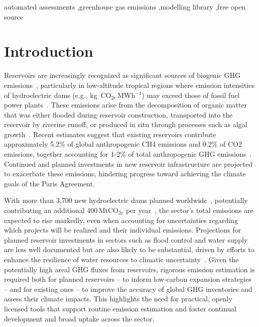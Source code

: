 \documentclass[review, authoryear, 1p]{elsarticle} %
\begin{document}
\begin{frontmatter}
\begin{keyword}
automated assessments \sep greenhouse gas emissions \sep modelling library \sep free open source
\end{keyword}

\end{frontmatter}

\section{Introduction}
\label{sec:introduction}

Reservoirs are increasingly recognized as significant sources of biogenic \ac{GHG} emissions~\citep{Barros2011}, particularly in low-altitude tropical regions where emission intensities of hydroelectric dams (e.g., kg~CO$_{2e}$\,MWh$^{-1}$) may exceed those of fossil fuel power plants~\citep{Fearnside2002}. 
These emissions arise from the decomposition of organic matter that was either flooded during reservoir construction, transported into the reservoir by riverine runoff, or produced in situ through processes such as algal growth~\citep{Louis2000}.
Recent estimates suggest that existing reservoirs contribute approximately 5.2\% of global anthropogenic \ac{CH4} emissions and 0.2\% of \ac{CO2} emissions, together accounting for 1-2\% of total anthropogenic \ac{GHG} emissions~\citep{Soued2022}.
Continued and planned investments in new reservoir infrastructure are projected to exacerbate these emissions, hindering progress toward achieving the climate goals of the Paris Agreement.

With more than 3,700 new hydroelectric dams planned worldwide~\citep{Zarfl2015}, potentially contributing an additional 400\,MtCO$_{2e}$ per year~\citep{janus2025planning}, the sector’s total emissions are expected to rise markedly, even when accounting for uncertainties regarding which projects will be realized and their individual emissions.
Projections for planned reservoir investments in sectors such as flood control and water supply are less well documented but are also likely to be substantial, driven by efforts to enhance the resilience of water resources to climatic uncertainty~\citep{ipcc2018, Sarkodie2022}.
Given the potentially high areal \ac{GHG} fluxes from reservoirs, rigorous emission estimation is required both for planned reservoirs -- to inform low-carbon expansion strategies -- and for existing ones -- to improve the accuracy of global \ac{GHG} inventories and assess their climate impacts.
This highlights the need for practical, openly licensed tools that support routine emission estimation and foster continual development and broad uptake across the sector.
\end{document}

